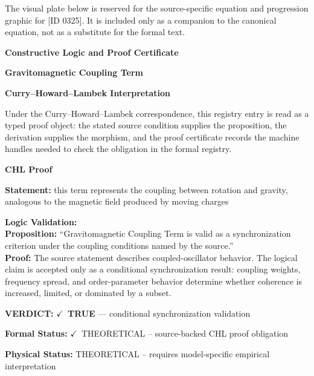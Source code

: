 \begingroup\footnotesize\sloppy
The visual plate below is reserved for the source-specific equation and progression graphic for [ID 0325]. It is included only as a companion to the canonical equation, not as a substitute for the formal text.
\par\endgroup
\ifTZPDarkEdition
{}
\fi

\clearpage
\begingroup\tzpsupportsetup
\noindent\textbf{\fontsize{10.8pt}{12.8pt}\selectfont [ID 0325] Constructive Logic and Proof Certificate}\par
\noindent\textbf{\fontsize{10pt}{12pt}\selectfont Gravitomagnetic Coupling Term}\par
\vspace{0.45em}
\begingroup
\footnotesize
\setlength{\parskip}{0.22em}
\setlength{\parindent}{0pt}
\noindent\textbf{Curry--Howard--Lambek Interpretation}\par
Under the Curry--Howard--Lambek correspondence, this registry entry is read as a typed proof
object: the stated source condition supplies the proposition, the derivation supplies the
morphism, and the proof certificate records the machine handles needed to check the obligation
in the formal registry.

\vspace{0.45em}
\noindent\textbf{CHL Proof}\par
\textbf{Statement:} this term represents the coupling between rotation and gravity, analogous to the
magnetic field produced by moving charges

\textbf{Logic Validation:}\\
\textbf{Proposition:} ``Gravitomagnetic Coupling Term is valid as a synchronization criterion under the coupling
conditions named by the source.''\\
\textbf{Proof:} The source statement describes coupled-oscillator behavior. The logical claim is
accepted only as a conditional synchronization result: coupling weights, frequency
spread, and order-parameter behavior determine whether coherence is increased, limited,
or dominated by a subset.

\textbf{VERDICT:} \ensuremath{\checkmark}\ \textbf{TRUE} --- conditional synchronization validation

\textbf{Formal Status:} \ensuremath{\checkmark}\ THEORETICAL -- source-backed CHL proof obligation

\textbf{Physical Status:} THEORETICAL -- requires model-specific empirical interpretation
\par\vspace{0.45em}
\par
\ifTZPDarkEdition
{}
\fi
\endgroup
\endgroup
